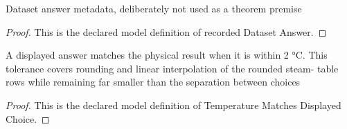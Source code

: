 \begin{definition}
  \label{def:physics:phyx-mini-0446:phyxminiproblems-problemphyxmini0446-recordeddatasetanswer}
  Dataset answer metadata, deliberately not used as a theorem premise
\end{definition}
\begin{proof}
  This is the declared model definition of recorded Dataset Answer.
\end{proof}
\begin{definition}
  \label{def:physics:phyx-mini-0446:phyxminiproblems-problemphyxmini0446-temperaturematchesdisplayedchoice}
  A displayed answer matches the physical result when it is within 2 °C. This tolerance covers rounding and linear interpolation of the rounded steam- table rows while remaining far smaller than the separation between choices
\end{definition}
\begin{proof}
  This is the declared model definition of Temperature Matches Displayed Choice.
\end{proof}

